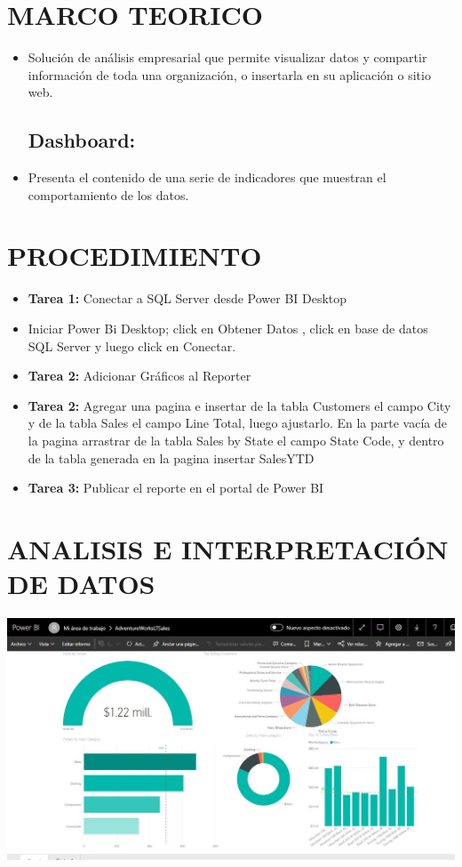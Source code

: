 \documentclass[12pt,letterpaper]{article}
\begin{document}
\section{MARCO TEORICO}
\begin{itemize}
\subsection{Power Bi:}
	\item Solución de análisis empresarial que permite visualizar datos y compartir información de toda una organización, o insertarla en su aplicación o sitio web. 
\subsection{Dashboard:}
	\item Presenta el contenido de una serie de indicadores que muestran el comportamiento de los datos. 
\end{itemize}
\section{PROCEDIMIENTO}
\begin{itemize}
	\item \textbf{Tarea 1:} Conectar a SQL Server desde Power BI Desktop 
	\item Iniciar Power Bi Desktop; click en Obtener Datos , click en base de datos SQL Server y luego click en Conectar.
	\item \textbf{Tarea 2:} Adicionar Gráficos al Reporter
	\item \textbf{Tarea 2:} Agregar una pagina e insertar de la tabla Customers el campo City y de la tabla Sales el campo Line Total, luego ajustarlo. En la parte vacía de la pagina arrastrar de la tabla Sales by State el campo State Code, y dentro de la tabla generada en la pagina insertar SalesYTD

	\item \textbf{Tarea 3:} Publicar el reporte en el portal de Power BI
\end{itemize}
\section{ANALISIS E INTERPRETACIÓN DE DATOS}

	\begin{center}
	\includegraphics[width=16cm]{./Imagenes/img}
	\end{center}
	
\end{document}
